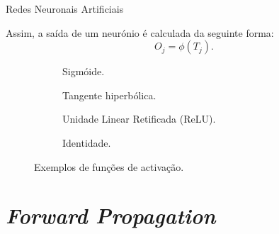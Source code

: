 \begin{frame}{Redes Neuronais Artificiais \cont}
	
	Assim, a saída de um neurónio é calculada da seguinte forma:
	\begin{equation}
		O_j = \phi(T_j).
	\end{equation}
	    
	\begin{figure}
		\centering
		\begin{subfigure}{0.45\textwidth}
			\centering
			\resizebox{!}{0.4\linewidth}{
				
			}
			\caption{Sigmóide.}
		\end{subfigure}
		\medskip
		\begin{subfigure}{0.45\textwidth}
			\centering
			\resizebox{!}{0.4\linewidth}{
				
			}
			\caption{Tangente hiperbólica.}
		\end{subfigure}
		\medskip
		\begin{subfigure}{0.45\textwidth}
			\centering
			\resizebox{!}{0.4\linewidth}{
				
			}
			\caption{Unidade Linear Retificada (ReLU).}
		\end{subfigure}
		\begin{subfigure}{0.45\textwidth}
			\centering
			\resizebox{!}{0.4\linewidth}{
				
			}
			\caption{Identidade.}
		\end{subfigure}
		\caption{Exemplos de funções de activação.}
	\end{figure}
	
	
\end{frame}

\section{\textit{Forward Propagation}}

